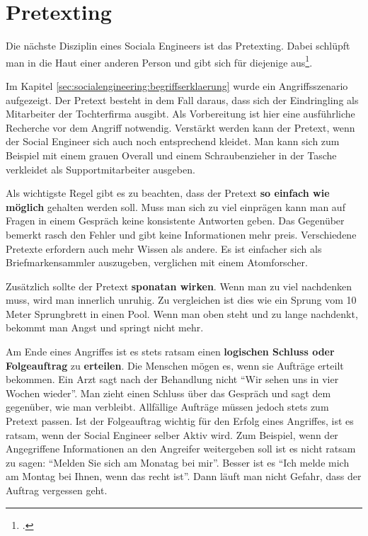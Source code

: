\section{Pretexting}
Die nächste Disziplin eines Sociala Engineers ist das Pretexting. Dabei schlüpft man in die Haut einer anderen Person und gibt sich für diejenige aus\footcite{human_hacking}.

Im Kapitel \cref{sec:socialengineering:begriffserklaerung} wurde ein Angriffsszenario aufgezeigt. Der Pretext besteht in dem Fall daraus, dass sich der Eindringling als Mitarbeiter der Tochterfirma ausgibt. Als Vorbereitung ist hier eine ausführliche Recherche vor dem Angriff notwendig. Verstärkt werden kann der Pretext, wenn der Social Engineer sich auch noch entsprechend kleidet. Man kann sich zum Beispiel mit einem grauen Overall und einem Schraubenzieher in der Tasche verkleidet als Supportmitarbeiter ausgeben.

Als wichtigste Regel gibt es zu beachten, dass der Pretext \textbf{so einfach wie möglich} gehalten werden soll. Muss man sich zu viel einprägen kann man auf Fragen in einem Gespräch keine konsistente Antworten geben. Das Gegenüber bemerkt rasch den Fehler und gibt keine Informationen mehr preis. Verschiedene Pretexte erfordern auch mehr Wissen als andere. Es ist einfacher sich als Briefmarkensammler auszugeben, verglichen mit einem Atomforscher. 

Zusätzlich sollte der Pretext \textbf{sponatan wirken}. Wenn man zu viel nachdenken muss, wird man innerlich unruhig. Zu vergleichen ist dies wie ein Sprung vom 10 Meter Sprungbrett in einen Pool. Wenn man oben steht und zu lange nachdenkt, bekommt man Angst und springt nicht mehr.

Am Ende eines Angriffes ist es stets ratsam einen \textbf{logischen Schluss oder Folgeauftrag} zu \textbf{erteilen}. Die Menschen mögen es, wenn sie Aufträge erteilt bekommen. Ein Arzt sagt nach der Behandlung nicht "`Wir sehen uns in vier Wochen wieder"'. Man zieht einen Schluss über das Gespräch und sagt dem gegenüber, wie man verbleibt. Allfällige Aufträge müssen jedoch stets zum Pretext passen. Ist der Folgeauftrag wichtig für den Erfolg eines Angriffes, ist es ratsam, wenn der Social Engineer selber Aktiv wird. Zum Beispiel, wenn der Angegriffene Informationen an den Angreifer weitergeben soll ist es nicht ratsam zu sagen: "`Melden Sie sich am Monatag bei mir"'. Besser ist es "`Ich melde mich am Montag bei Ihnen, wenn das recht ist"'. Dann läuft man nicht Gefahr, dass der Auftrag vergessen geht.

